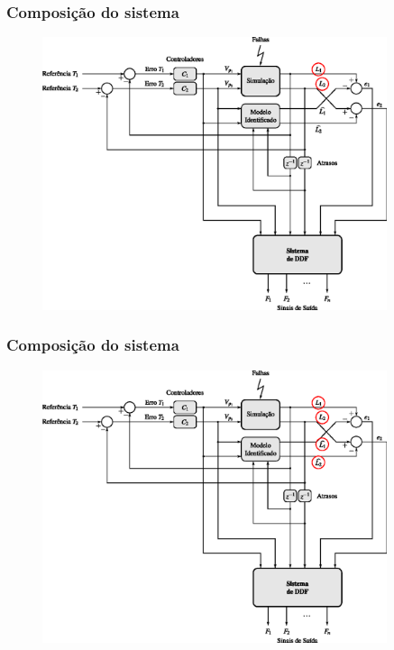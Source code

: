 \documentclass{beamer}
\begin{document}
\begin{frame}
    \frametitle{Composição do sistema}

\begin{figure}[htb]
\centering
    \includegraphics[width=0.9\textwidth]{imgs/sistema/eps/composicao_mod_4}
\end{figure}
\end{frame}

\begin{frame}
    \frametitle{Composição do sistema}

\begin{figure}[htb]
\centering
    \includegraphics[width=0.9\textwidth]{imgs/sistema/eps/composicao_mod_5}
\end{figure}
\end{frame}
\end{document}
